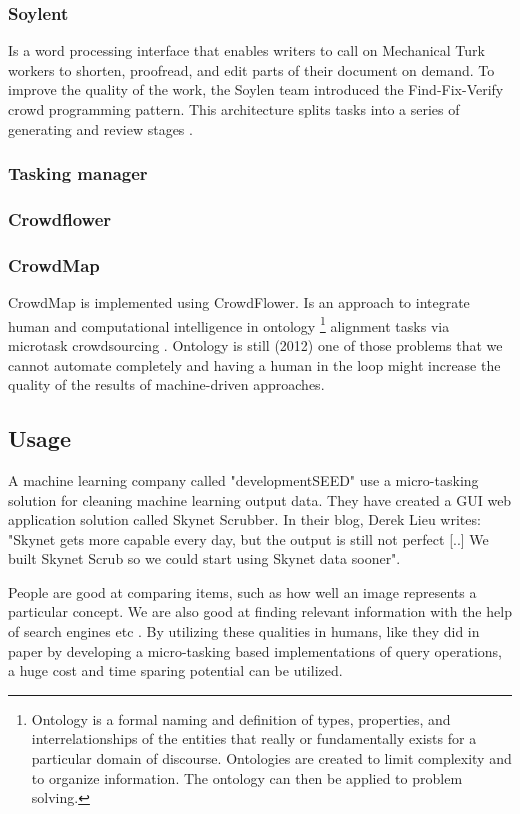 \subsubsection{Soylent}\label{sec:soylent}
Is a word processing interface that enables writers to call on Mechanical Turk workers to shorten, proofread, and edit parts of their document on demand. To improve the quality of the work, the Soylen team introduced the Find-Fix-Verify crowd programming pattern. This architecture splits tasks into a series of generating and review stages \citep{Bernstein2015a}. 

\subsubsection{Tasking manager}
\subsubsection{Crowdflower}  
\subsubsection{CrowdMap}
CrowdMap is implemented using CrowdFlower. 
Is an approach to integrate human and computational intelligence in ontology \footnote{\label{ontology} Ontology is a formal naming and definition of types, properties, and interrelationships of the entities that really or fundamentally exists for a particular domain of discourse. Ontologies are created to limit complexity and to organize information. The ontology can then be applied to problem solving. } alignment tasks via microtask crowdsourcing \citep{Sarasua2012}. Ontology is still (2012) one of those problems that we cannot automate completely and having a human in the loop might increase the quality of the results of machine-driven approaches. 

\subsection{Usage}
A machine learning company called "developmentSEED" use a micro-tasking solution for cleaning machine learning output data. They have created a GUI web application solution called Skynet Scrubber. In their blog, Derek Lieu writes: "Skynet gets more capable every day, but the output is still not perfect [..] We built Skynet Scrub so we could start using Skynet data sooner". 

People are good at comparing items, such as how well an image represents a particular concept. We are also good at finding relevant information with the help of search engines etc \citep{Franklin2011}. By utilizing these qualities in humans, like they did in \citep{Franklin2011} paper by developing a micro-tasking based implementations of query operations, a huge cost and time sparing potential can be utilized. 

